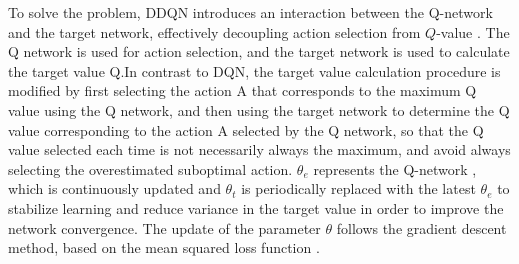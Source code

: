 \documentclass[journal]{IEEEtran}
\begin{document}
To solve the problem, DDQN introduces an interaction between the Q-network and the target network, effectively decoupling action selection from \( Q\)-value \cite{thrun2014issues}. The Q network is used for action selection, and the target network is used to calculate the target value Q.In contrast to DQN, the target value calculation procedure is modified by first selecting the action A that corresponds to the maximum Q value using the Q network, and then using the target network to determine the Q value corresponding to the action A selected by the Q network, so that the Q value selected each time is not necessarily always the maximum, and avoid always selecting the overestimated suboptimal action. 
\( \theta_e \) represents the Q-network , which is continuously updated and \( \theta_t \) is periodically replaced with the latest \( \theta_e \) to stabilize learning and reduce variance in the target value in order to improve the network convergence. The update of the parameter \( \theta \) follows the gradient descent method, based on the mean squared loss function \cite{10488443}.

\end{document}
